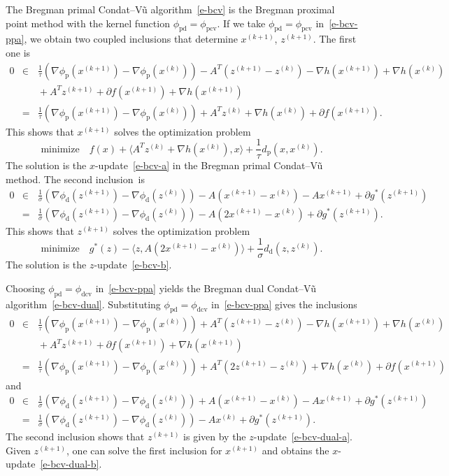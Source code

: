 \documentclass[letterpaper,11pt]{article}
\newcommand{\BEAS}{\begin{eqnarray*}}
\newcommand{\EEAS}{\end{eqnarray*}}
\newcommand{\inprod}[2]{\langle#1, #2\rangle}
\newcommand{\primal}{\mathrm p}
\newcommand{\dual}{\mathrm d}
\begin{document}
The Bregman primal Condat--V\~u algorithm~\eqref{e-bcv}
is the Bregman proximal point method with the kernel function 
$\phi_\mathrm{pd} = \phi_\mathrm{pcv}$.
If we take $\phi_\mathrm{pd} = \phi_\mathrm{pcv}$ in~\eqref{e-bcv-ppa},
we obtain two coupled inclusions that determine $x^{(k+1)}$, $z^{(k+1)}$.  
The first one is
\BEAS
0 &\in & \frac{1}{\tau}(\nabla \phi_\primal(x^{(k+1)})
  -\nabla \phi_\primal(x^{(k)}))-A^T(z^{(k+1)}-z^{(k)})
  -\nabla h(x^{(k+1)})+\nabla h(x^{(k)}) \\
&  & \mbox{} +A^Tz^{(k+1)}+\partial f(x^{(k+1)})+\nabla h(x^{(k+1)}) \\
&= & \frac{1}{\tau}(\nabla \phi_\primal(x^{(k+1)})
  -\nabla \phi_\primal(x^{(k)}))+A^Tz^{(k)}
  +\nabla h(x^{(k)})+\partial f(x^{(k+1)}).
\EEAS
This shows that $x^{(k+1)}$ solves the optimization problem
\[
  \mbox{minimize} \quad f(x)+\inprod{A^Tz^{(k)}+\nabla h(x^{(k)})}{x}
  +\frac{1}{\tau} d_\primal(x,x^{(k)}).
\]
The solution is the $x$-update~\eqref{e-bcv-a} in the Bregman primal
Condat--V\~{u} method. The second inclusion~is
\BEAS
0 &\in & \frac{1}{\sigma}(\nabla \phi_\dual(z^{(k+1)})
  -\nabla \phi_\dual(z^{(k)}))-A(x^{(k+1)}-x^{(k)})-Ax^{(k+1)}
  +\partial g^\ast(z^{(k+1)}) \\
&= & \frac{1}{\sigma}(\nabla \phi_\dual(z^{(k+1)})
  -\nabla \phi_\dual(z^{(k)}))-A(2x^{(k+1)}-x^{(k)})
  +\partial g^\ast(z^{(k+1)}).
\EEAS
This shows that $z^{(k+1)}$ solves the optimization problem
\[
  \mbox{minimize} \quad g^\ast(z)-\inprod{z}{A(2x^{(k+1)}-x^{(k)})}
  +\frac{1}{\sigma} d_\dual(z,z^{(k)}).
\]
The solution is the $z$-update~\eqref{e-bcv-b}.

Choosing $\phi_\mathrm{pd} = \phi_\mathrm{dcv}$ in~\eqref{e-bcv-ppa}
yields the Bregman dual Condat--V\~u algorithm~\eqref{e-bcv-dual}.
Substituting $\phi_\mathrm{pd} = \phi_\mathrm{dcv}$ in~\eqref{e-bcv-ppa}
gives the inclusions
\BEAS
0 &\in & \frac{1}{\tau}(\nabla \phi_\primal(x^{(k+1)})
  -\nabla \phi_\primal(x^{(k)}))+A^T(z^{(k+1)}-z^{(k)})
  -\nabla h(x^{(k+1)})+\nabla h(x^{(k)}) \\
&  & \mbox{} +A^Tz^{(k+1)}+\partial f(x^{(k+1)})+\nabla h(x^{(k+1)}) \\
&= & \frac{1}{\tau}(\nabla \phi_\primal(x^{(k+1)})
  -\nabla \phi_\primal(x^{(k)}))+A^T(2z^{(k+1)} - z^{(k)})
  +\nabla h(x^{(k)})+\partial f(x^{(k+1)})
\EEAS
and
\BEAS
0 &\in & \frac{1}{\sigma}(\nabla \phi_\dual(z^{(k+1)})
  -\nabla \phi_\dual(z^{(k)}))+A(x^{(k+1)}-x^{(k)})-Ax^{(k+1)}
  +\partial g^\ast(z^{(k+1)}) \\
&= & \frac{1}{\sigma}(\nabla \phi_\dual(z^{(k+1)})
  -\nabla \phi_\dual(z^{(k)}))-A x^{(k)} +\partial g^\ast(z^{(k+1)}).
\EEAS
The second inclusion shows that $z^{(k+1)}$ is given by the
$z$-update~\eqref{e-bcv-dual-a}.
Given $z^{(k+1)}$, one can solve the first inclusion for $x^{(k+1)}$
and obtains the $x$-update~\eqref{e-bcv-dual-b}.
\end{document}
